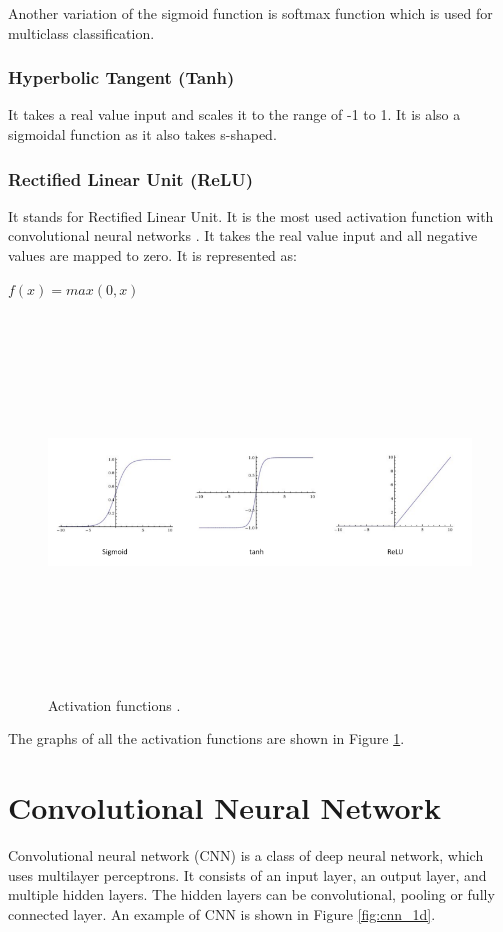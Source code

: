 Another variation of the sigmoid function is softmax function which is used for multiclass classification.

\subsubsection{Hyperbolic Tangent (Tanh)}
It takes a real value input and scales it to the range of -1 to 1. It is also a sigmoidal function as it also takes s-shaped.


\subsubsection{Rectified Linear Unit (ReLU)}
It stands for Rectified Linear Unit. It is the most used activation function with convolutional neural networks \cite{ujjwalkarn}. It takes the real value input and all negative values are mapped to zero. It is represented as:

\begin{center}
	$f(x) = max(0, x)$
\end{center}

\begin{figure}[htpb]
	\centering
	\includegraphics[width=15cm,height=10cm,keepaspectratio=true]{images/act-funcs}
	\caption{
		Activation functions \cite{ujjwalkarn}.
	}
	\label{fig:funcs}
\end{figure}

The graphs of all the activation functions are shown in Figure \ref{fig:funcs}.

\section{Convolutional Neural Network}
Convolutional neural network (CNN) is a class of deep neural network, which uses multilayer perceptrons. It consists of an input layer, an output layer, and multiple hidden layers. The hidden layers can be convolutional, pooling or fully connected layer. An example of CNN is shown in Figure \ref{fig:cnn_1d}. 

